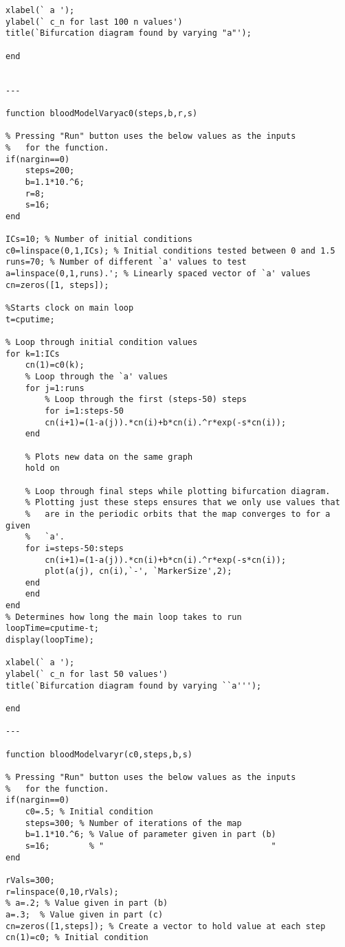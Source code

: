 \begin{verbatim}
xlabel(` a ');
ylabel(` c_n for last 100 n values')
title(`Bifurcation diagram found by varying "a"');

end


---

function bloodModelVaryac0(steps,b,r,s)

% Pressing "Run" button uses the below values as the inputs
%   for the function.
if(nargin==0)
    steps=200;
    b=1.1*10.^6;
    r=8;
    s=16;
end

ICs=10; % Number of initial conditions
c0=linspace(0,1,ICs); % Initial conditions tested between 0 and 1.5
runs=70; % Number of different `a' values to test
a=linspace(0,1,runs).'; % Linearly spaced vector of `a' values
cn=zeros([1, steps]); 

%Starts clock on main loop
t=cputime;

% Loop through initial condition values
for k=1:ICs
    cn(1)=c0(k);    
    % Loop through the `a' values
    for j=1:runs    
        % Loop through the first (steps-50) steps
        for i=1:steps-50
        cn(i+1)=(1-a(j)).*cn(i)+b*cn(i).^r*exp(-s*cn(i));
    end
    
    % Plots new data on the same graph
    hold on
    
    % Loop through final steps while plotting bifurcation diagram.
    % Plotting just these steps ensures that we only use values that 
    %   are in the periodic orbits that the map converges to for a given
    %   `a'.
    for i=steps-50:steps
        cn(i+1)=(1-a(j)).*cn(i)+b*cn(i).^r*exp(-s*cn(i));
        plot(a(j), cn(i),`-', `MarkerSize',2);
    end
    end
end
% Determines how long the main loop takes to run
loopTime=cputime-t;
display(loopTime);

xlabel(` a ');
ylabel(` c_n for last 50 values')
title(`Bifurcation diagram found by varying ``a''');

end

---

function bloodModelvaryr(c0,steps,b,s)

% Pressing "Run" button uses the below values as the inputs
%   for the function.
if(nargin==0)
    c0=.5; % Initial condition
    steps=300; % Number of iterations of the map
    b=1.1*10.^6; % Value of parameter given in part (b)
    s=16;        % "                                  "
end

rVals=300;
r=linspace(0,10,rVals);
% a=.2; % Value given in part (b)
a=.3;  % Value given in part (c) 
cn=zeros([1,steps]); % Create a vector to hold value at each step
cn(1)=c0; % Initial condition


\end{verbatim}
